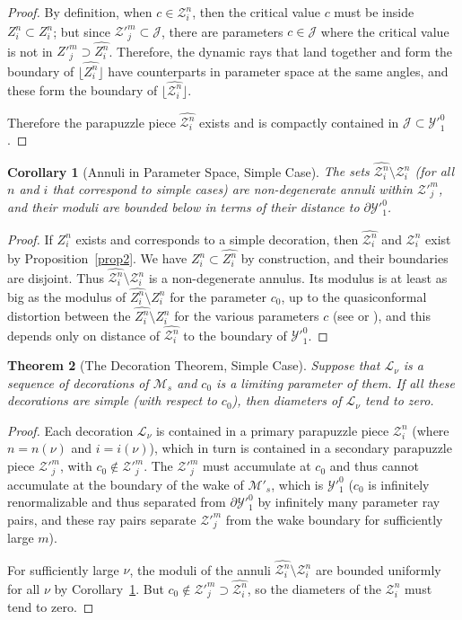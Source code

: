\documentclass[12pt,a4paper]{amsart}
\newtheorem{theorem}{Theorem}[section]
\newtheorem{cor}[theorem]{Corollary}
\newcommand{\JJ}{\mathcal J}
\newcommand{\LL}{\mathcal L}
\newcommand{\MM}{\mathcal M}
\newcommand{\YYp}{{\mathcal Y'}}
\newcommand{\YY}{\mathcal Y}
\newcommand{\ZZ}{\mathcal Z}
\newcommand{\sm}{\setminus}
\begin{document}
\begin{proof}
By definition, when $c\in \ZZ^n_i$, then the critical value $c$
    must be inside $Z^n_i\subset \widehat{Z^n_i}$; but since
$\ZZ'^m_j\subset\JJ$, there are parameters $c\in\JJ$ where the
critical value is not in $Z'^m_j\supset \widehat {Z^n_i}$.
Therefore, the dynamic rays that land together and form the boundary
of $\lfloor \widehat{Z^n_i} \rfloor$ have counterparts in parameter
space at the same angles, and these form the boundary of
$\lfloor\widehat{\ZZ^n_i}\rfloor$.

Therefore the parapuzzle piece $\widehat{\ZZ^n_i}$ exists and is
compactly contained in $\JJ\subset\YYp^0_1$.
\end{proof}

\begin{cor}[Annuli in Parameter Space, Simple Case]
\label{Cor:ParaAnnuli} The sets $\widehat{\ZZ^n_i}\setminus \ZZ^n_i$
(for all $n$ and $i$ that correspond to simple cases) are
non-degenerate annuli within $\ZZ'^m_j$, and their moduli are
bounded below in terms of their distance to $\partial\YY'^0_1$.
\end{cor}
\begin{proof}
If $Z^n_i$ exists and corresponds to a simple decoration, then
$\widehat{\ZZ^n_i}$ and $\ZZ^n_i$ exist by Proposition~\ref{prop2}.
We have $Z^n_i\subset \widehat{Z^n_i}$ by construction, and their
boundaries are disjoint. Thus $\widehat{\ZZ^n_i}\setminus \ZZ^n_i$
is a non-degenerate annulus. Its modulus is at least as big as the
modulus of $\widehat{Z^n_i}\sm Z^n_i$ for the parameter $c_0$, up to
the quasiconformal distortion between the $\widehat{Z^n_i}\sm Z^n_i$
for the various parameters $c$ (see \cite{ALS} or \cite{L2}), and
this depends only on distance of $\widehat{\ZZ^n_i}$ to the boundary
of $\YYp^0_1$.
\end{proof}

\begin{theorem}[The Decoration Theorem, Simple Case]
Suppose that $\LL_\nu$ is a sequence of decorations of $\MM_s$ and
$c_0$ is a limiting parameter of them. If all these decorations are
simple (with respect to $c_0$), then diameters of $\LL_\nu$ tend to
zero.
\end{theorem}
\begin{proof}
Each decoration $\LL_\nu$ is contained in a primary parapuzzle piece
${\ZZ}^n_i$ (where $n=n(\nu)$ and $i=i(\nu)$), which in turn is
contained in a secondary parapuzzle piece ${\ZZ'}^m_j$, with
$c_0\not\in {\ZZ'}^m_j$. The ${\ZZ'}^m_j$ must accumulate at $c_0$
and thus cannot accumulate at the boundary of the wake of $\MM'_s$,
which is $\YY'^0_1$ ($c_0$ is infinitely renormalizable and thus
separated from $\partial \YY'^0_1$ by infinitely many parameter ray
pairs, and these ray pairs separate ${\ZZ'}^m_j$ from the wake
boundary for sufficiently large $m$).

For sufficiently large $\nu$, the moduli of the annuli
$\widehat{\ZZ^n_i}\setminus \ZZ^n_i$ are bounded uniformly for all
$\nu$ by Corollary~\ref{Cor:ParaAnnuli}. But
$c_0\not\in\ZZ'^m_j\supset \widehat{\ZZ^n_i}$, so the diameters of
the $\ZZ^n_i$ must tend to zero.
\end{proof}
\end{document}
